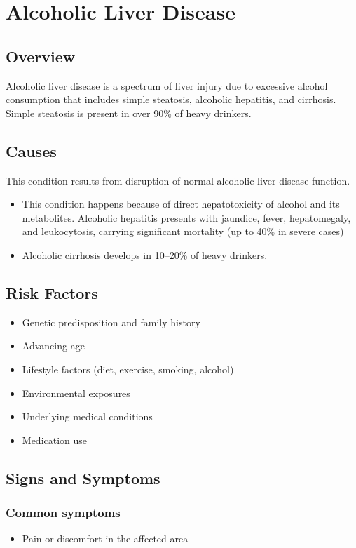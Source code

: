 \chapter{Alcoholic Liver Disease}
\label{sec:Alcoholic Liver Disease}

\section{Overview}
Alcoholic liver disease is a spectrum of liver injury due to excessive alcohol consumption that includes simple steatosis, alcoholic hepatitis, and cirrhosis. Simple steatosis is present in over 90\% of heavy drinkers.
\section{Causes}
This condition results from disruption of normal alcoholic liver disease function.

\begin{itemize}[noitemsep]
  \item This condition happens because of direct hepatotoxicity of alcohol and its metabolites. Alcoholic hepatitis presents with jaundice, fever, hepatomegaly, and leukocytosis, carrying significant mortality (up to 40\% in severe cases)
  \item Alcoholic cirrhosis develops in 10--20\% of heavy drinkers.
\end{itemize}
\section{Risk Factors}


\begin{itemize}[noitemsep]
  \item Genetic predisposition and family history
  \item Advancing age
  \item Lifestyle factors (diet, exercise, smoking, alcohol)
  \item Environmental exposures
  \item Underlying medical conditions
  \item Medication use
\end{itemize}
\section{Signs and Symptoms}

\subsection{Common symptoms}
\begin{itemize}[noitemsep]
  \item Pain or discomfort in the affected area
  \end{itemize}

